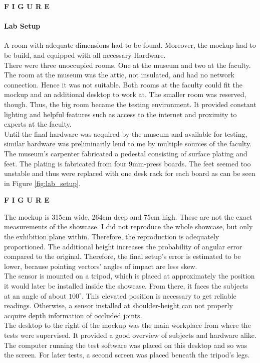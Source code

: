 \textbf{F I G U R E}

\paragraph{Lab Setup} A room with adequate dimensions had to be found. Moreover, the mockup had to be build, and equipped with all necessary Hardware. 
\\
There were three unoccupied rooms. One at the museum and two at the faculty. The room at the museum was the attic, not insulated, and had no network connection. Hence it was not suitable. Both rooms at the faculty could fit the mockup and an additional desktop to work at. The smaller room was reserved, though. Thus, the big room became the testing environment. It provided constant lighting and helpful features such as access to the internet and proximity to experts at the faculty.
\\
Until the final hardware was acquired by the museum and available for testing, similar hardware was preliminarily lend to me by multiple sources of the faculty. The museum's carpenter fabricated a pedestal consisting of surface plating and feet. The plating is fabricated from four 9mm-press boards. The feet seemed too unstable and thus were replaced with one desk rack for each board as can be seen in Figure \ref{fig:lab_setup}.

\textbf{F I G U R E}

The mockup is 315cm wide, 264cm deep and 75cm high. These are not the exact measurements of the showcase. I did not reproduce the whole showcase, but only the exhibition plane within. Therefore, the reproduction is adequately proportioned. The additional height increases the probability of angular error compared to the original. Therefore, the final setup's error is estimated to be lower, because pointing vectors' angles of impact are less skew.  
\\
The sensor is mounted on a tripod, which is placed at approximately the position it would later be installed inside the showcase. From there, it faces the subjects at an angle of about $100^\circ$. This elevated position is necessary to get reliable readings. Otherwise, a sensor installed at shoulder-height can not properly acquire depth information of occluded joints.
\\
The desktop to the right of the mockup was the main workplace from where the tests were supervised. It provided a good overview of subjects and hardware alike. The computer running the test software was placed on this desktop and so was the screen. For later tests, a second screen was placed beneath the tripod's legs.


